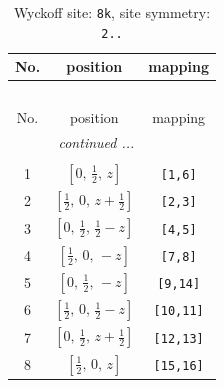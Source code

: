 \documentclass[fleqn,8pt]{jsarticle}
\begin{document}
\renewcommand{\arraystretch}{1.2}
\begin{longtable}{ccc}
\caption{Wyckoff site: {\tt 8k}, site symmetry: {\tt 2..}}
 \\
 \hline \hline
No. & position & mapping \\ \hline \endfirsthead

\multicolumn{2}{l}{\tablename\ \thetable{}} \\
 \hline \hline
No. & position & mapping \\ \hline \endhead

 \hline \hline
\multicolumn{2}{r}{\footnotesize\it continued ...} \\ \endfoot

 \hline \hline
\multicolumn{2}{r}{} \\ \endlastfoot

1 & $\left[ 0,\, \frac{1}{2},\, z \right]$ & {\tt [1,6]} \\ \hline
2 & $\left[ \frac{1}{2},\, 0,\, z + \frac{1}{2} \right]$ & {\tt [2,3]} \\ \hline
3 & $\left[ 0,\, \frac{1}{2},\, \frac{1}{2} - z \right]$ & {\tt [4,5]} \\ \hline
4 & $\left[ \frac{1}{2},\, 0,\, - z \right]$ & {\tt [7,8]} \\ \hline
5 & $\left[ 0,\, \frac{1}{2},\, - z \right]$ & {\tt [9,14]} \\ \hline
6 & $\left[ \frac{1}{2},\, 0,\, \frac{1}{2} - z \right]$ & {\tt [10,11]} \\ \hline
7 & $\left[ 0,\, \frac{1}{2},\, z + \frac{1}{2} \right]$ & {\tt [12,13]} \\ \hline
8 & $\left[ \frac{1}{2},\, 0,\, z \right]$ & {\tt [15,16]} \\
\end{longtable}
\renewcommand{\arraystretch}{1.2}
\end{document}

